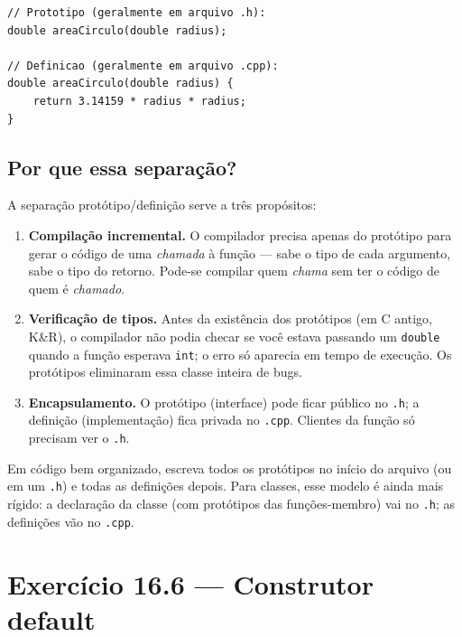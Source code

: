 \documentclass[11pt,a4paper]{article}
\begin{document}
\begin{lstlisting}[style=cppcode,numbers=none]
// Prototipo (geralmente em arquivo .h):
double areaCirculo(double radius);

// Definicao (geralmente em arquivo .cpp):
double areaCirculo(double radius) {
    return 3.14159 * radius * radius;
}
\end{lstlisting}

\subsection*{Por que essa separa\c{c}\~ao?}

A separa\c{c}\~ao prot\'otipo/defini\c{c}\~ao serve a tr\^es prop\'ositos:

\begin{enumerate}[leftmargin=*,itemsep=0pt]
  \item \textbf{Compila\c{c}\~ao incremental.} O compilador precisa apenas do prot\'otipo para gerar o c\'odigo de uma \emph{chamada} \`a fun\c{c}\~ao --- sabe o tipo de cada argumento, sabe o tipo do retorno. Pode-se compilar quem \emph{chama} sem ter o c\'odigo de quem \'e \emph{chamado}.
  \item \textbf{Verifica\c{c}\~ao de tipos.} Antes da exist\^encia dos prot\'otipos (em C antigo, K\&R), o compilador n\~ao podia checar se voc\^e estava passando um \texttt{double} quando a fun\c{c}\~ao esperava \texttt{int}; o erro s\'o aparecia em tempo de execu\c{c}\~ao. Os prot\'otipos eliminaram essa classe inteira de bugs.
  \item \textbf{Encapsulamento.} O prot\'otipo (interface) pode ficar p\'ublico no \texttt{.h}; a defini\c{c}\~ao (implementa\c{c}\~ao) fica privada no \texttt{.cpp}. Clientes da fun\c{c}\~ao s\'o precisam ver o \texttt{.h}.
\end{enumerate}

\begin{boaprat}
Em c\'odigo bem organizado, escreva todos os prot\'otipos no in\'icio do arquivo (ou em um \texttt{.h}) e todas as defini\c{c}\~oes depois. Para classes, esse modelo \'e ainda mais r\'igido: a declara\c{c}\~ao da classe (com prot\'otipos das fun\c{c}\~oes-membro) vai no \texttt{.h}; as defini\c{c}\~oes v\~ao no \texttt{.cpp}.
\end{boaprat}

\section{Exerc\'icio 16.6 --- Construtor default}
\end{document}
